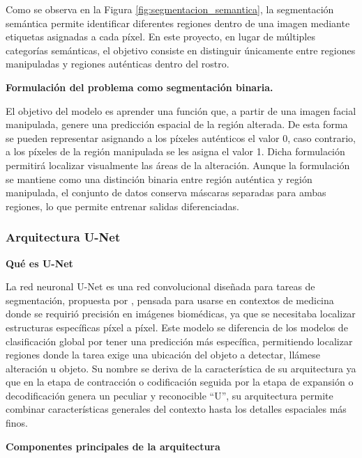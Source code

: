 Como se observa en la Figura \ref{fig:segmentacion_semantica}, la segmentación semántica permite identificar diferentes regiones dentro de una imagen mediante etiquetas asignadas a cada píxel. En este proyecto, en lugar de múltiples categorías semánticas, el objetivo consiste en distinguir únicamente entre regiones manipuladas y regiones auténticas dentro del rostro.

\medskip\textbf{Formulación del problema como segmentación binaria.}

El objetivo del modelo es aprender una función que, a partir de una imagen facial manipulada, genere una predicción espacial de la región alterada. De esta forma se pueden representar asignando a los píxeles auténticos el valor 0, caso contrario, a los píxeles de la región manipulada se les asigna el valor 1. Dicha formulación permitirá localizar visualmente las áreas de la alteración. Aunque la formulación se mantiene como una distinción binaria entre región auténtica y región manipulada, el conjunto de datos conserva máscaras separadas para ambas regiones, lo que permite entrenar salidas diferenciadas.


\subsubsection{Arquitectura U-Net}

\medskip\textbf{Qué es U-Net}

La red neuronal U-Net es una red convolucional diseñada para tareas de segmentación, propuesta por \textcite{Ronneberger2015}, pensada para usarse en contextos de medicina donde se requirió precisión en imágenes biomédicas, ya que se necesitaba localizar estructuras específicas píxel a píxel. Este modelo se diferencia de los modelos de clasificación global por tener una predicción más específica, permitiendo localizar regiones donde la tarea exige una ubicación del objeto a detectar, llámese alteración u objeto. Su nombre se deriva de la característica de su arquitectura ya que en la etapa de contracción o codificación seguida por la etapa de expansión o decodificación genera un peculiar y reconocible “U”, su arquitectura permite combinar características generales del contexto hasta los detalles espaciales más finos.

\medskip\textbf{Componentes principales de la arquitectura}

